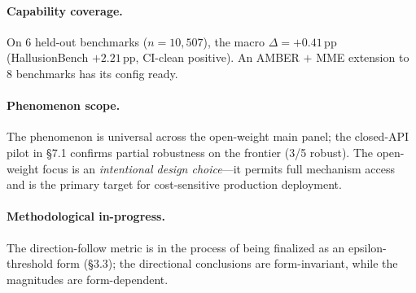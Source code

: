 \documentclass[11pt]{article}
\begin{document}
\paragraph{Capability coverage.}
On 6 held-out benchmarks ($n=10{,}507$), the macro $\Delta = +0.41$\,pp (HallusionBench $+2.21$\,pp, CI-clean positive). An AMBER $+$ MME extension to 8 benchmarks has its config ready.

\paragraph{Phenomenon scope.}
The phenomenon is universal across the open-weight main panel; the closed-API pilot in \S7.1 confirms partial robustness on the frontier (3/5 robust). The open-weight focus is an \textit{intentional design choice}---it permits full mechanism access and is the primary target for cost-sensitive production deployment.

\paragraph{Methodological in-progress.}
The direction-follow metric is in the process of being finalized as an epsilon-threshold form (\S3.3); the directional conclusions are form-invariant, while the magnitudes are form-dependent.

\end{document}
